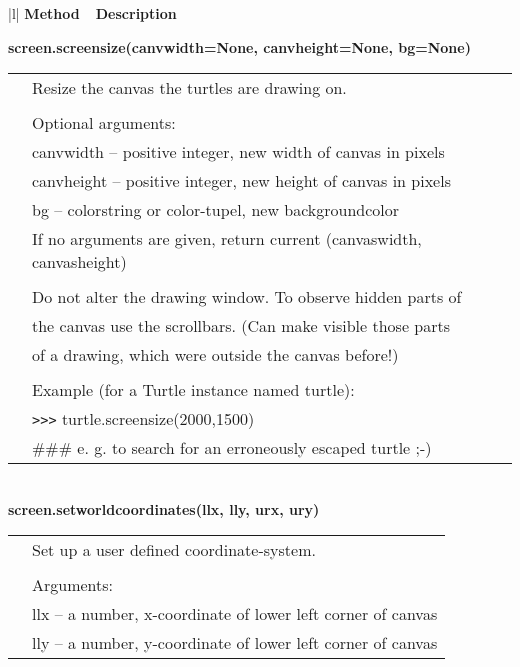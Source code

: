 \begin{center}
{\small
\begin{tabular}{|l|} \hline
{\bf Method~~Description}  \\ \hline\hline 



{\bf    screen.screensize(canvwidth=None, canvheight=None, bg=None)} \\
   \begin{tabular}{p{0.25in}p{4in}}
&        Resize the canvas the turtles are drawing on. \\
&  \\
&        Optional arguments: \\
&        canvwidth -- positive integer, new width of canvas in pixels \\
&        canvheight --  positive integer, new height of canvas in pixels \\
&        bg -- colorstring or color-tupel, new backgroundcolor \\
&        If no arguments are given, return current (canvaswidth, canvasheight) \\
&  \\
&        Do not alter the drawing window. To observe hidden parts of \\
&        the canvas use the scrollbars. (Can make visible those parts \\
&        of a drawing, which were outside the canvas before!) \\
&  \\
&        Example (for a Turtle instance named turtle): \\
&        \verb+>+\verb+>+\verb+>+ turtle.screensize(2000,1500) \\
&            \#\#\# e. g. to search for an erroneously escaped turtle ;-) \\
\end{tabular} \\ \hline
{\bf    screen.setworldcoordinates(llx, lly, urx, ury)} \\
   \begin{tabular}{p{0.25in}p{4in}}
&        Set up a user defined coordinate-system. \\
&  \\
&        Arguments: \\
&        llx -- a number, x-coordinate of lower left corner of canvas \\
&        lly -- a number, y-coordinate of lower left corner of canvas \\

\end{tabular}
\end{tabular}}
\end{center}
